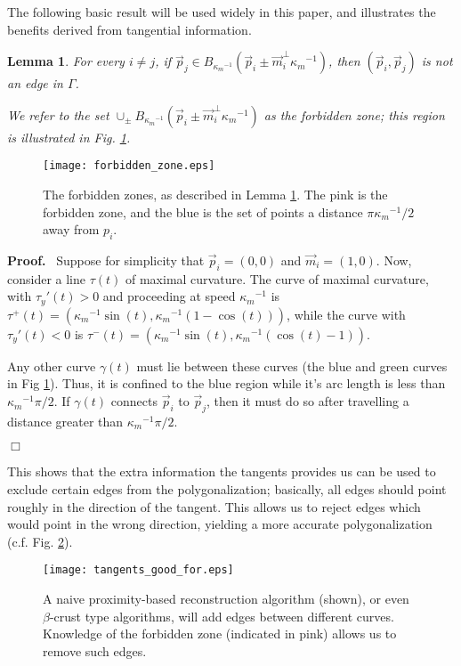 \documentclass{article}
\newenvironment{proof}{
  \noindent\textbf{Proof.}\ }{\hspace*{\fill}
  \begin{math}\Box\end{math}\medskip}
\newtheorem{lemma}[cntr]{Lemma}
\numberwithin{cntr}{section}
\numberwithin{equation}{section}
\newcommand{\vp}[0]{{\vec{p}}}
\newcommand{\vm}[0]{{\vec{m}}}
\newcommand{\poly}{{\Gamma}}
\newcommand{\ball}[2]{ { B_{#1}(#2) } }
\newcommand{\kmax}{{\kappa_{m}}}
\newcommand{\kmaxi}{{\kmax^{-1}}}
\begin{document}
The following basic result will be used widely in this paper, and illustrates the benefits derived from tangential information.
\begin{lemma}
  \label{lem:forbiddenZone}
  For every $i \neq j$, if $\vp_{j} \in \ball{\kmaxi}{\vp_{i} \pm \vm_{i}^{\perp} \kmaxi}$, then $(\vp_{i},\vp_{j})$ is not an edge in $\poly$.

  We refer to the set $\cup_{\pm} \ball{\kmaxi}{\vp_{i} \pm \vm_{i}^{\perp} \kmaxi}$ as the \emph{forbidden zone}; this region is illustrated in Fig. \ref{fig:forbiddenZone}.
\end{lemma}
\begin{figure}
\setlength{\unitlength}{0.240900pt}
\ifx\plotpoint\undefined\newsavebox{\plotpoint}\fi
\sbox{\plotpoint}{\rule[-0.200pt]{0.400pt}{0.400pt}}%
\texttt{[image: forbidden\_zone.eps]}

\caption{The forbidden zones, as described in Lemma \ref{lem:forbiddenZone}. The pink is the forbidden zone, and the blue is the set of points a distance $\pi \kmaxi/2$ away from $p_{i}$.}
\label{fig:forbiddenZone}
\end{figure}
\begin{proof}
  Suppose for simplicity that $\vp_{i}=(0,0)$ and $\vm_{i}=(1,0)$. Now, consider a line $\tau(t)$ of maximal curvature. The curve of maximal curvature, with $\tau_{y}'(t) > 0$ and proceeding at speed $\kmaxi$ is $\tau^{+}(t)=(\kmaxi \sin(t), \kmaxi (1-\cos(t)))$, while the curve with $\tau_{y}'(t) < 0$ is $\tau^{-}(t)=(\kmaxi \sin(t), \kmaxi (\cos(t)-1))$.

Any other curve $\gamma(t)$ must lie between these curves (the blue and green curves in Fig \ref{lem:forbiddenZone}). Thus, it is confined to the blue region while it's arc length is less than $\kmaxi \pi/2$. If $\gamma(t)$ connects $\vp_{i}$ to $\vp_{j}$, then it must do so after travelling a distance greater than $\kmaxi \pi/2$.

\end{proof}

This shows that the extra information the tangents provides us can be used to exclude certain edges from the polygonalization; basically, all edges should point roughly in the direction of the tangent. This allows us to reject edges which would point in the wrong direction, yielding a more accurate polygonalization (c.f. Fig. \ref{fig:proximityVsTangentBased}).

\begin{figure}
\setlength{\unitlength}{0.240900pt}
\ifx\plotpoint\undefined\newsavebox{\plotpoint}\fi
\sbox{\plotpoint}{\rule[-0.200pt]{0.400pt}{0.400pt}}%
\texttt{[image: tangents\_good\_for.eps]}

\caption{A naive proximity-based reconstruction algorithm (shown), or even $\beta$-crust type algorithms, will add edges between different curves. Knowledge of the forbidden zone (indicated in pink) allows us to remove such edges.}
\label{fig:proximityVsTangentBased}
\end{figure}
\end{document}
